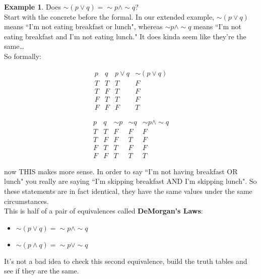 \documentclass[10pt]{article}
\theoremstyle{definition}
\newtheorem{example}[equation]{Example}
\begin{document}
\begin{example}
Does $\sim(p \vee q)=\sim p \wedge \sim q$?\\

Start with the concrete before the formal.  In our extended example, $\sim(p\vee q)$ means ``I'm not eating breakfast or lunch", whereas $\sim p \wedge \sim q$ means ``I'm not eating breakfast and I'm not eating lunch."  It does kinda seem like they're the same\ldots\\

So formally:

$$\begin{array}{c|c|c|c}
p&q&p\vee q& \sim (p\vee q)\\
\hline
T & T&T&F\\
T&F&T&F\\
F&T&T&F\\
F&F&F&T
\end{array}$$

$$\begin{array}{c|c|c|c|c}
p&q&\sim p& \sim q & \sim p \wedge \sim q\\
\hline
T & T&F&F&F\\
T&F&F&T&F\\
F&T&T&F&F\\
F&F&T&T&T
\end{array}$$

now THIS makes more sense.  In order to say ``I'm not having breakfast OR lunch"  you really are saying ``I'm skipping breakfast AND I'm skipping lunch".  So these statements are in fact identical, they have the same values under the same circumstances.\\

This is half of a pair of equivalences called {\bf DeMorgan's Laws}:

\begin{itemize}
\item $\sim(p \vee q)=\sim p \wedge \sim q$
\item $\sim(p \wedge q)=\sim p \vee \sim q$
\end{itemize}

It's not a bad idea to check this second equivalence, build the truth tables and see if they are the same.

\end{example}
\end{document}
